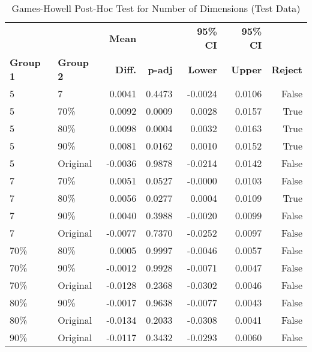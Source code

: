 \begin{table}[!ht]
    \captionsetup{skip=5pt}
\centering
\caption{Games-Howell Post-Hoc Test for Number of Dimensions (Test Data)}
\label{tbl:games_howell_num_dim}
        \begin{tabular}{llrrrrr}
            \toprule
             &  & \textbf{Mean} &  & \textbf{95\% CI} & \textbf{95\% CI} & \\
            \textbf{Group 1} & \textbf{Group 2} & \textbf{Diff.} & \textbf{p-adj} & \textbf{Lower} & \textbf{Upper} & \textbf{Reject}\\
\midrule
5 & 7 & 0.0041 & 0.4473 & -0.0024 & 0.0106 & False \\
5 & 70\% & 0.0092 & 0.0009 & 0.0028 & 0.0157 & True \\
5 & 80\% & 0.0098 & 0.0004 & 0.0032 & 0.0163 & True \\
5 & 90\% & 0.0081 & 0.0162 & 0.0010 & 0.0152 & True \\
5 & Original & -0.0036 & 0.9878 & -0.0214 & 0.0142 & False \\
7 & 70\% & 0.0051 & 0.0527 & -0.0000 & 0.0103 & False \\
7 & 80\% & 0.0056 & 0.0277 & 0.0004 & 0.0109 & True \\
7 & 90\% & 0.0040 & 0.3988 & -0.0020 & 0.0099 & False \\
7 & Original & -0.0077 & 0.7370 & -0.0252 & 0.0097 & False \\
70\% & 80\% & 0.0005 & 0.9997 & -0.0046 & 0.0057 & False \\
70\% & 90\% & -0.0012 & 0.9928 & -0.0071 & 0.0047 & False \\
70\% & Original & -0.0128 & 0.2368 & -0.0302 & 0.0046 & False \\
80\% & 90\% & -0.0017 & 0.9638 & -0.0077 & 0.0043 & False \\
80\% & Original & -0.0134 & 0.2033 & -0.0308 & 0.0041 & False \\
90\% & Original & -0.0117 & 0.3432 & -0.0293 & 0.0060 & False \\
\bottomrule
\end{tabular}
\end{table}

